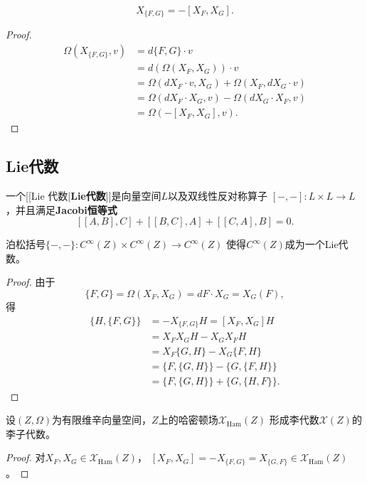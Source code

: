 \begin{corollary}
    $$X_{\{F,G\}}=-[X_F,X_G].$$
\end{corollary}
\begin{proof}
    \begin{align*}
        \Omega(X_{\{F,G\}},v)&=d\{F,G\}\cdot v\\
        &=d(\Omega(X_F,X_G))\cdot v\\
        &=\Omega(dX_F\cdot v,X_G)+\Omega(X_F,dX_G\cdot v)\\
        &=\Omega(dX_F\cdot X_G,v)-\Omega(dX_G\cdot X_F,v)\\
        &=\Omega(-[X_F,X_G],v).
    \end{align*}
\end{proof}

\subsection{Lie代数}
\begin{definition}
    一个[[Lie 代数|\textbf{Lie代数}]]是向量空间$L$以及双线性反对称算子
    $[-,-]\colon L\times L\to L$，并且满足\textbf{Jacobi恒等式}
    $$[[A,B],C]+[[B,C],A]+[[C,A],B]=0.$$
\end{definition}

\begin{theorem}
    泊松括号$\{-,-\}\colon C^\infty(Z)\times C^\infty(Z)\to C^\infty(Z)$
    使得$C^\infty(Z)$成为一个Lie代数。
\end{theorem}
\begin{proof}
    由于$$\{F,G\}=\Omega(X_F,X_G)=dF\cdot X_G=X_G(F),$$
    得
    \begin{align*}
        \{H,\{F,G\}\}&=-X_{\{F,G\}}H=[X_F,X_G]H\\
        &=X_FX_GH-X_GX_FH\\
        &=X_F\{G,H\}-X_G\{F,H\}\\
        &=\{F,\{G,H\}\}-\{G,\{F,H\}\}\\
        &=\{F,\{G,H\}\}+\{G,\{H,F\}\}.
    \end{align*}
\end{proof}

\begin{corollary}
    设$(Z,\Omega)$为有限维辛向量空间，$Z$上的哈密顿场$\mathscr{X}_{\text{Ham}}(Z)$
    形成李代数$\mathscr{X}(Z)$的李子代数。
\end{corollary}
\begin{proof}
    对$X_F,X_G\in\mathscr{X}_{\text{Ham}}(Z)$，
    $[X_F,X_G]=-X_{\{F,G\}}=X_{\{G,F\}}\in\mathscr{X}_{\text{Ham}}(Z)$。
\end{proof}

